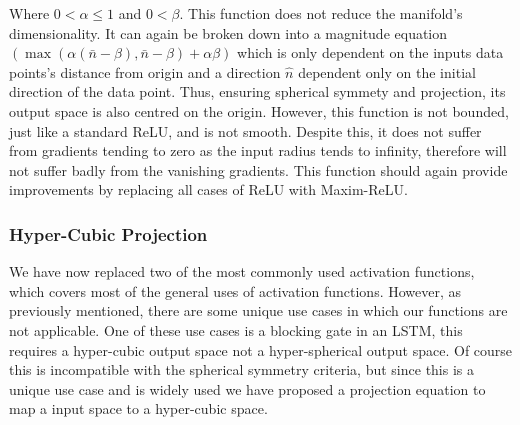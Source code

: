 \documentclass[onecolumn]{article}
\begin{document}
    Where ${0} < \alpha \leq {1}$ and ${0} < \beta$. This function does not reduce the manifold's dimensionality. It can again be broken down into a magnitude equation $\left(\max\left(\alpha\left(\bar{n}-\beta\right),\bar{n}-\beta\right)+\alpha\beta\right)$ which is only dependent on the inputs data points's distance from origin and a direction $\hat{n}$ dependent only on the initial direction of the data point. Thus, ensuring spherical symmety and projection, its output space is also centred on the origin. However, this function is not bounded, just like a standard ReLU, and is not smooth. Despite this, it does not suffer from gradients tending to zero as the input radius tends to infinity, therefore will not suffer badly from the vanishing gradients. This function should again provide improvements by replacing all cases of ReLU with Maxim-ReLU.
    
    \subsubsection{Hyper-Cubic Projection}
    
    We have now replaced two of the most commonly used activation functions, which covers most of the general uses of activation functions. However, as previously mentioned, there are some unique use cases in which our functions are not applicable. One of these use cases is a blocking gate in an LSTM, this requires a hyper-cubic output space not a hyper-spherical output space. Of course this is incompatible with the spherical symmetry criteria, but since this is a unique use case and is widely used we have proposed a projection equation to map a input space to a hyper-cubic space.


     


\end{document}

